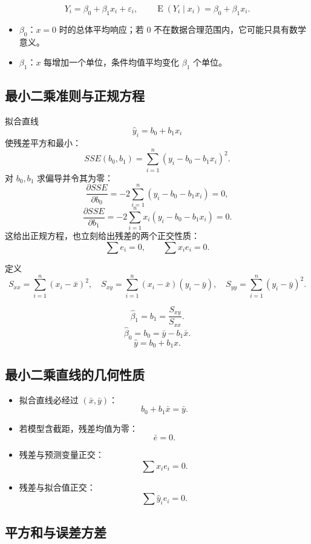 \documentclass[11pt,a4paper]{article}
\newcommand{\E}{\operatorname{E}}
\newcommand{\1}{\mathbf{1}}
\begin{document}
\[
  Y_i=\beta_0+\beta_1x_i+\varepsilon_i,
  \qquad
  \E(Y_i\mid x_i)=\beta_0+\beta_1x_i.
\]
\begin{itemize}
  \item $\beta_0$：$x=0$ 时的总体平均响应；若 $0$ 不在数据合理范围内，它可能只具有数学意义。
  \item $\beta_1$：$x$ 每增加一个单位，条件均值平均变化 $\beta_1$ 个单位。
\end{itemize}

\subsection{最小二乘准则与正规方程}

拟合直线
\[
  \hat y_i=b_0+b_1x_i
\]
使残差平方和最小：
\[
  SSE(b_0,b_1)
  =
  \sum_{i=1}^n(y_i-b_0-b_1x_i)^2.
\]
对 $b_0,b_1$ 求偏导并令其为零：
\[
  \frac{\partial SSE}{\partial b_0}
  =
  -2\sum_{i=1}^n(y_i-b_0-b_1x_i)=0,
\]
\[
  \frac{\partial SSE}{\partial b_1}
  =
  -2\sum_{i=1}^nx_i(y_i-b_0-b_1x_i)=0.
\]
这给出正规方程，也立刻给出残差的两个正交性质：
\[
  \sum e_i=0,
  \qquad
  \sum x_ie_i=0.
\]

定义
\[
  S_{xx}=\sum_{i=1}^n(x_i-\bar x)^2,
\quad
  S_{xy}=\sum_{i=1}^n(x_i-\bar x)(y_i-\bar y),
\quad
  S_{yy}=\sum_{i=1}^n(y_i-\bar y)^2.
\]

\begin{memorybox}
\[
  \boxed{\hat\beta_1=b_1=\frac{S_{xy}}{S_{xx}}.}
\]
\[
  \boxed{\hat\beta_0=b_0=\bar y-b_1\bar x.}
\]
\[
  \boxed{\hat y=b_0+b_1x.}
\]
\end{memorybox}

\subsection{最小二乘直线的几何性质}

\begin{itemize}
  \item 拟合直线必经过 $(\bar x,\bar y)$：
  \[
    b_0+b_1\bar x=\bar y.
  \]
  \item 若模型含截距，残差均值为零：
  \[
    \bar e=0.
  \]
  \item 残差与预测变量正交：
  \[
    \sum x_ie_i=0.
  \]
  \item 残差与拟合值正交：
  \[
    \sum \hat y_ie_i=0.
  \]
\end{itemize}

\subsection{平方和与误差方差}
\end{document}
